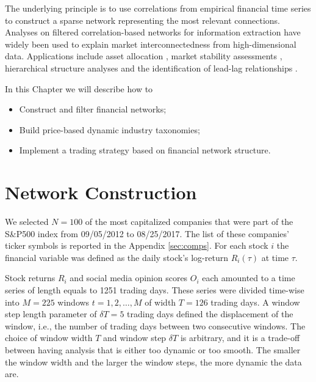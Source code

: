 \documentclass[]{book}
\providecommand{\tightlist}{%
  \setlength{\itemsep}{0pt}\setlength{\parskip}{0pt}}
\theoremstyle{definition}
\theoremstyle{definition}
\theoremstyle{definition}
\theoremstyle{remark}
\begin{document}
The underlying principle is to use correlations from empirical financial
time series to construct a sparse network representing the most relevant
connections. Analyses on filtered correlation-based networks for
information extraction \citep{song2008analysis, aste2010correlation}
have widely been used to explain market interconnectedness from
high-dimensional data. Applications include asset allocation
\citep{LI2018, pozzi2013spread}, market stability assessments
\citep{morales2012dynamical}, hierarchical structure analyses
\citep{Mantegna1999, aste2010correlation, Tumminello201040, musmeci2014clustering, song2012hierarchical}
and the identification of lead-lag relationships
\citep{curme2015coupled}.

In this Chapter we will describe how to

\begin{itemize}
\tightlist
\item
  Construct and filter financial networks;
\item
  Build price-based dynamic industry taxonomies;
\item
  Implement a trading strategy based on financial network structure.
\end{itemize}

\section{Network Construction}\label{network-construction}

We selected \(N = 100\) of the most capitalized companies that were part
of the S\&P500 index from 09/05/2012 to 08/25/2017. The list of these
companies' ticker symbols is reported in the Appendix \ref{sec:comps}.
For each stock \(i\) the financial variable was defined as the daily
stock's log-return \(R_i(\tau)\) at time \(\tau\).

Stock returns \(R_i\) and social media opinion scores \(O_i\) each
amounted to a time series of length equals to 1251 trading days. These
series were divided time-wise into \(M = 225\) windows
\(t = 1, 2, \ldots, M\) of width \(T = 126\) trading days. A window step
length parameter of \(\delta T = 5\) trading days defined the
displacement of the window, i.e., the number of trading days between two
consecutive windows. The choice of window width \(T\) and window step
\(\delta T\) is arbitrary, and it is a trade-off between having analysis
that is either too dynamic or too smooth. The smaller the window width
and the larger the window steps, the more dynamic the data are.
\end{document}
